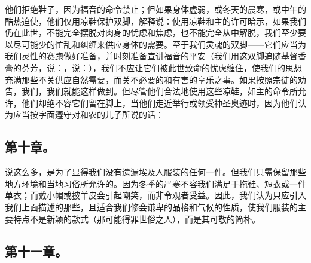 他们拒绝鞋子，因为福音的命令禁止；但如果身体虚弱，或冬天的晨寒，或中午的酷热迫使，他们仅用凉鞋保护双脚，解释说：使用凉鞋和主的许可暗示，如果我们仍在此世，不能完全摆脱对肉身的忧虑和焦虑，也不能完全从中解脱，我们至少要以尽可能少的忙乱和纠缠来供应身体的需要。至于我们灵魂的双脚——它们应当为我们灵性的赛跑做好准备，并时刻准备宣讲福音的平安（我们用这双脚追随基督香膏的芬芳，说：，说：），我们不应让它们被此世致命的忧虑缠住，使我们的思想充满那些不关供应自然需要，而关不必要的和有害的享乐之事。如果按照宗徒的劝告，我们，我们就能这样做到。但尽管他们合法地使用这些凉鞋，如主的命令所允许，他们却绝不容它们留在脚上，当他们走近举行或领受神圣奥迹时，因为他们认为应当按字面遵守对和农的儿子所说的话：\par


\subsection{第十章。}

\par

说这么多，是为了显得我们没有遗漏埃及人服装的任何一件。但我们只需保留那些地方环境和当地习俗所允许的。因为冬季的严寒不容我们满足于拖鞋、短衣或一件单衣；而戴小帽或披羊皮会引起嘲笑，而非令观者受益。因此，我们认为只应引入我们上面描述的那些，且适合我们修会谦卑的品格和气候的性质，使我们服装的主要特点不是新颖的款式（那可能得罪世俗之人），而是其可敬的简朴。\par


\subsection{第十一章。}

\par

